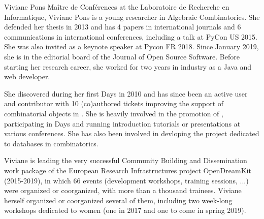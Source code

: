 \begin{participant}[type=PI,PM=2,gender=female]{Viviane Pons}
  Maître de Conférences at the Laboratoire de Recherche en Informatique, Viviane Pons is a
  young researcher in Algebraic Combinatorics. She defended her thesis in 2013 and has 4
  papers in international journals and 6 communications in international
  conferences, including a talk at PyCon US 2015. She was also invited as a keynote speaker
  at Pycon FR 2018. Since January 2019, she is in the editorial board of the Journal of Open Source Software.
  Before starting her research career,
  she worked for two years in industry as a Java and web developer.

  She discovered \Sage during her first \Sage Days in 2010 and has since been an active user
  and contributor with 10 (co)authored tickets improving the support of combinatorial
  objects in \Sage. She is heavily involved in the promotion of \Sage, participating in
  \Sage Days and running \Sage introduction tutorials or \Sage presentations at various
  conferences. She has also been involved in devloping the project 
  dedicated to databases in combinatorics.

  Viviane is leading the very successful Community Building and
  Dissemination work package of the European Research Infrastructures
  project OpenDreamKit (2015-2019), in which 66 events (development
  workshops, training sessions, ...) were organized or coorganized,
  with more than a thousand trainees. Viviane herself organized or
  coorganized several of them, including two week-long workshops
  dedicated to women (one in 2017 and one to come in spring 2019).
\end{participant}
